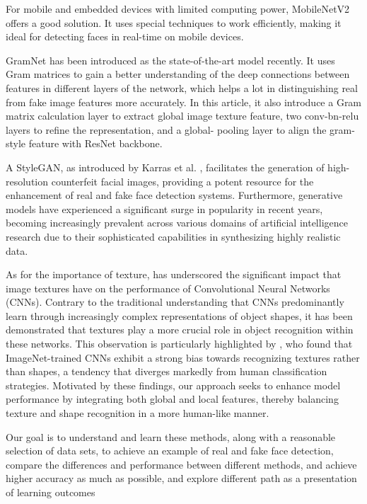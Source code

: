 \documentclass[final]{cvpr}
\begin{document}
For mobile and embedded devices with limited computing power, MobileNetV2 offers a good solution. It uses special techniques to work efficiently, making it ideal for detecting faces in real-time on mobile devices\cite{sandler2019mobilenetv2}.

GramNet has been introduced as the state-of-the-art model recently. It uses Gram matrices to gain a better understanding of the deep connections between features in different layers of the network, which helps a lot in  distinguishing real from fake image features more accurately\cite{liu2020global}. In this article, it also introduce a Gram matrix calculation layer to extract global image texture feature, two conv-bn-relu layers to refine the representation, and a global- pooling layer to align the gram-style feature with ResNet backbone.

A StyleGAN, as introduced by Karras et al. \cite{karras2019stylebased}, facilitates the generation of high-resolution counterfeit facial images, providing a potent resource for the enhancement of real and fake face detection systems. Furthermore, generative models have experienced a significant surge in popularity in recent years, becoming increasingly prevalent across various domains of artificial intelligence research due to their sophisticated capabilities in synthesizing highly realistic data.

As for the importance of texture, \cite{geirhos2022imagenettrained} has underscored the significant impact that image textures have on the performance of Convolutional Neural Networks (CNNs). Contrary to the traditional understanding that CNNs predominantly learn through increasingly complex representations of object shapes, it has been demonstrated that textures play a more crucial role in object recognition within these networks. This observation is particularly highlighted by \cite{geirhos2022imagenettrained}, who found that ImageNet-trained CNNs exhibit a strong bias towards recognizing textures rather than shapes, a tendency that diverges markedly from human classification strategies. Motivated by these findings, our approach seeks to enhance model performance by integrating both global and local features, thereby balancing texture and shape recognition in a more human-like manner.


Our goal is to understand and learn these methods, along with a reasonable selection of data sets, to achieve an example of real and fake face detection, compare the differences and performance between different methods, and achieve higher accuracy as much as possible, and explore different path as a presentation of learning outcomes
\end{document}
